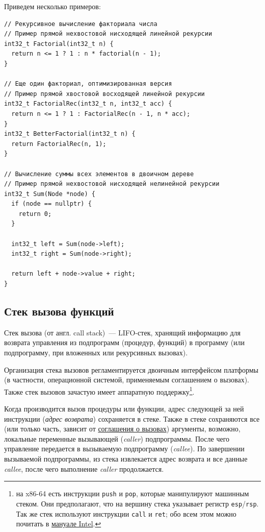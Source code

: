 Приведем несколько примеров:
\begin{verbatim}
// Рекурсивное вычисление факториала числа
// Пример прямой нехвостовой нисходящей линейной рекурсии
int32_t Factorial(int32_t n) {
  return n <= 1 ? 1 : n * factorial(n - 1);
}

// Еще один факториал, оптимизированная версия
// Пример прямой хвостовой восходящей линейной рекурсии
int32_t FactorialRec(int32_t n, int32_t acc) {
  return n <= 1 ? 1 : FactorialRec(n - 1, n * acc);
}
int32_t BetterFactorial(int32_t n) {
  return FactorialRec(n, 1);
}

// Вычисление суммы всех элементов в двоичном дереве
// Пример прямой нехвостовой нисходящей нелинейной рекурсии
int32_t Sum(Node *node) {
  if (node == nullptr) {
    return 0;
  }

  int32_t left = Sum(node->left);
  int32_t right = Sum(node->right);

  return left + node->value + right;
}
\end{verbatim}

\subsection{Стек вызова функций}
Стек вызова (от англ. call stack)~--- LIFO-стек, хранящий информацию для возврата
управления из подпрограмм (процедур, функций) в программу
(или подпрограмму, при вложенных или рекурсивных вызовах).

Организация стека вызовов регламентируется двоичным интерфейсом платформы (в частности, операционной системой,
применяемым соглашением о вызовах). Также стек вызовов зачастую имеет аппаратную поддержку\footnote{на x86-64 есть инструкции \texttt{push} и \texttt{pop}, которые
  манипулируют машинным стеком. Они предполагают, что на вершину стека указывает регистр \texttt{esp}/\texttt{rsp}. Так же стек используют
  инструкции \texttt{call} и \texttt{ret}; обо всем этом можно почитать в \href{https://www.cs.cmu.edu/~410/doc/intel-isr.pdf}{мануале Intel}.
}.

Когда производится вызов процедуры или функции, адрес следующей за ней инструкции (\textit{адрес возврата}) сохраняется в стеке. Также в
стеке сохраняются все (или только часть, зависит от \href{https://en.wikipedia.org/wiki/Calling_convention}{соглашения о вызовах})
аргументы, возможно, локальные переменные вызывающей (\textit{caller}) подпрограммы. После чего управление передается в вызываемую
подпрограмму (\textit{callee}). По завершении вызываемой подпрограммы, из стека извлекается адрес возврата и все данные \textit{callee},
после чего выполнение \textit{caller} продолжается.

